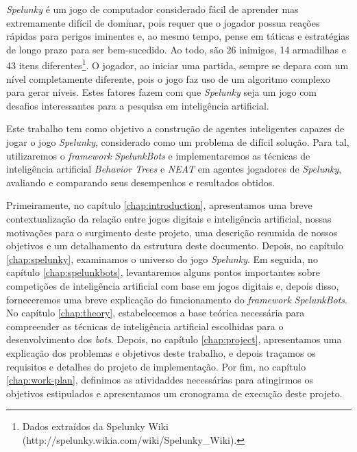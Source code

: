 \textit{Spelunky} é um jogo de computador considerado fácil de aprender mas
extremamente difícil de dominar, pois requer que o jogador possua reações
rápidas para perigos iminentes e, ao mesmo tempo, pense em táticas e estratégias
de longo prazo para ser bem-sucedido. Ao todo, são 26 inimigos, 14 armadilhas e
43 itens diferentes\footnote{Dados extraídos da Spelunky Wiki
(http://spelunky.wikia.com/wiki/Spelunky\_Wiki).}. O jogador, ao iniciar uma
partida, sempre se depara com um nível completamente diferente, pois o jogo faz
uso de um algoritmo complexo para gerar níveis. Estes fatores fazem com que
\textit{Spelunky} seja um jogo com desafios interessantes para a pesquisa em
inteligência artificial.

Este trabalho tem como objetivo a construção de agentes inteligentes capazes de
jogar o jogo \textit{Spelunky}, considerado como um problema de difícil solução.
Para tal, utilizaremos o \textit{framework} \textit{SpelunkBots} e
implementaremos as técnicas de inteligência artificial \textit{Behavior Trees} e
\textit{NEAT} em agentes jogadores de \textit{Spelunky}, avaliando e comparando
seus desempenhos e resultados obtidos.

Primeiramente, no capítulo \ref{chap:introduction}, apresentamos uma breve
contextualização da relação entre jogos digitais e inteligência artificial,
nossas motivações para o surgimento deste projeto, uma descrição resumida de
nossos objetivos e um detalhamento da estrutura deste documento. Depois, no
capítulo \ref{chap:spelunky}, examinamos o universo do jogo \textit{Spelunky}.
Em seguida, no capítulo \ref{chap:spelunkbots}, levantaremos alguns pontos
importantes sobre competições de inteligência artificial com base em jogos
digitais e, depois disso, forneceremos uma breve explicação do funcionamento do
\textit{framework} \textit{SpelunkBots}. No capítulo \ref{chap:theory},
estabelecemos a base teórica necessária para compreender as técnicas de
inteligência artificial escolhidas para o desenvolvimento dos \textit{bots}.
Depois, no capítulo \ref{chap:project}, apresentamos uma explicação dos
problemas e objetivos deste trabalho, e depois traçamos os requisitos e detalhes
do projeto de implementação. Por fim, no capítulo \ref{chap:work-plan},
definimos as atividaddes necessárias para atingirmos os objetivos estipulados e
apresentamos um cronograma de execução deste projeto.
